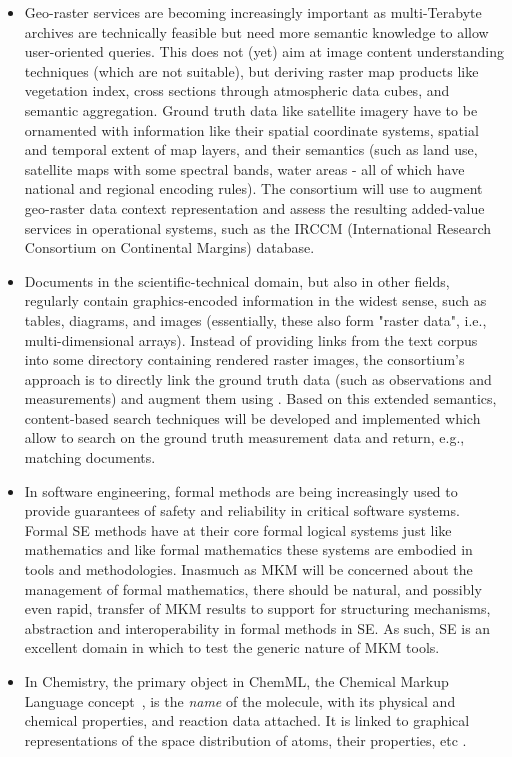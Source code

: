 \documentclass{llncs}
\def\omdoc{\sc{OMDoc}}
\begin{document}
\begin{itemize}
\item Geo-raster services are becoming increasingly important as multi-Terabyte archives
  are technically feasible but need more semantic knowledge to allow user-oriented
  queries.  This does not (yet) aim at image content understanding techniques (which are
  not suitable), but deriving raster map products like vegetation index, cross sections
  through atmospheric data cubes, and semantic aggregation. Ground truth data like
  satellite imagery have to be ornamented with information like their spatial coordinate
  systems, spatial and temporal extent of map layers, and their semantics (such as land
  use, satellite maps with some spectral bands, water areas - all of which have national
  and regional encoding rules).  The consortium will use {\omdoc} to augment geo-raster
  data context representation and assess the resulting added-value services in operational
  systems, such as the IRCCM (International Research Consortium on Continental Margins)
  database.
\item Documents in the scientific-technical domain, but also in other fields, regularly
  contain graphics-encoded information in the widest sense, such as tables, diagrams, and
  images (essentially, these also form "raster data", i.e., multi-dimensional arrays).
  Instead of providing links from the text corpus into some directory containing rendered
  raster images, the consortium's approach is to directly link the ground truth data (such
  as observations and measurements) and augment them using {\omdoc}. Based on this
  extended semantics, content-based search techniques will be developed and implemented
  which allow to search on the ground truth measurement data and return, e.g., matching
  documents.
\item In software engineering, formal methods are being increasingly used to provide
  guarantees of safety and reliability in critical software systems. Formal SE methods
  have at their core formal logical systems just like mathematics and like formal
  mathematics these systems are embodied in tools and methodologies. Inasmuch as MKM will
  be concerned about the management of formal mathematics, there should be natural, and
  possibly even rapid, transfer of MKM results to support for structuring mechanisms,
  abstraction and interoperability in formal methods in SE. As such, SE is an excellent
  domain in which to test the generic nature of MKM tools.
\item In Chemistry, the primary object in ChemML, the Chemical Markup Language
  concept~\cite{ISN:murray-rust}, is the {\emph{name}} of the molecule, with its physical
  and chemical properties, and reaction data attached. It is linked to graphical
  representations of the space distribution of atoms, their properties, etc
  \cite{Hilf:aud}.
\end{itemize}
\end{document}
